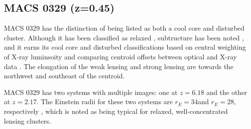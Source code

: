 \documentclass[iop,numberedappendix,apj]{emulateapj}
\begin{document}



\subsection{MACS 0329 (z=0.45)}
\label{sec:results_m0329}


MACS 0329 has the distinction of being listed as both a cool core and disturbed cluster. Although it has
been classified as relaxed \citep{schmidt2007}, subtructure has been noted \citep{maughan2008}, and it earns
its cool core and disturbed classifications based on central weighting of X-ray luminsoity and comparing
centroid offsets between optical and X-ray data \citep{sayers2013}. The elongation of the weak lensing and
strong lensing are towards the northwest and southeast of the centroid.

MACS 0329 has two systems with multiple images: one at $z = 6.18$ and the other at $z = 2.17$. The Einstein
radii for these two systems are $r_E = 34$\asecs and $r_E = 28$\asec, respectively \citep{zitrin2012b}, which is
noted as being typical for relaxed, well-concentrated lensing clusters. 


\end{document}
